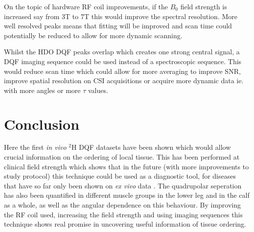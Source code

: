 On the topic of hardware \ac{RF} coil improvements, if the $B_0$ field strength is increased say from 3T to 7T this would improve the spectral resolution. More well resolved peaks means that fitting will be improved and scan time could potentially be reduced to allow for more dynamic scanning.

Whilst the \ac{HDO} \ac{DQF} peaks overlap which creates one strong central signal, a \ac{DQF} imaging sequence could be used instead of a spectroscopic sequence. This would reduce scan time which could allow for more averaging to improve \ac{SNR}, improve spatial resolution on \ac{CSI} acquisitions or acquire more dynamic data ie. with more angles or more $\tau$ values.

\section{Conclusion}

Here the first \textit{in vivo} $^2$H \ac{DQF} datasets have been shown which would allow crucial information on the ordering of local tissue. This has been performed at clinical field strength which shows that in the future (with more improvements to study protocol) this technique could be used as a diagnostic tool, for diseases that have so far only been shown on \textit{ex vivo} data \cite{Ooms2015DoubleTissue, Sharf1995DetectionNMR-Spectroscopy, Perea20072HDisc, Sun2010InvestigationNMR}. The quadrupolar seperation has also been quantified in different muscle groups in the lower leg and in the calf as a whole, as well as the angular dependence on this behaviour. By improving the \ac{RF} coil used, increasing the field strength and using imaging sequences this technique shows real promise in uncovering useful information of tissue ordering.


% 